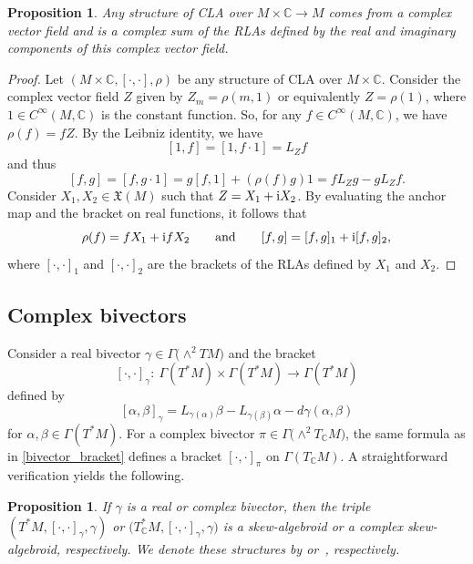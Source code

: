 \documentclass[pdftex]{sigma}
\numberwithin{equation}{section}
\newtheorem{Proposition}[Theorem]{Proposition}
 { \theoremstyle{definition}
\newtheorem{Definition}[Theorem]{Definition}
\newtheorem{Note}[Theorem]{Note}
\newtheorem{Example}[Theorem]{Example}
\newtheorem{Examples}[Theorem]{Examples}
\newtheorem{Remark}[Theorem]{Remark} }
\newcommand{\C}{{\mathbb{C}}}
\begin{document}
\begin{Proposition}
 Any structure of CLA over $M\times \C\to M$ comes from a complex vector field and is a complex sum of the RLAs defined by the real and imaginary components of this complex vector field.
\end{Proposition}
\begin{proof}
 Let $(M\times\C, [\cdot,\cdot], \rho)$ be any structure of CLA over $M\times \C$. Consider the complex vector field $Z$ given by $Z_m=\rho(m,1)$ or equivalently $Z=\rho(1)$, where $1\in C^{\infty}(M,\C)$ is the constant function. So, for any $f\in C^{\infty}(M,\C)$, we have $\rho(f)=fZ$. By the Leibniz identity, we have
 \[[1,f]=[1,f\cdot 1]=L_Z f\]
 and thus
 \[[f,g]=[f,g\cdot 1]=g[f,1]+(\rho(f)g)1=fL_Z g-gL_Z f.\]
 Consider $X_1,X_2\in \mathfrak{X}(M)$ such that $Z=X_1+{\rm i}X_2$. By evaluating the anchor map and the bracket on real functions, it follows that
 \[\rho(f)=fX_1+{\rm i}fX_2\qquad \text{and}\qquad [f,g]=[f,g]_1+{\rm i}[f,g]_2,\]
 where $[\cdot,\cdot]_1$ and $[\cdot,\cdot]_2$ are the brackets of the RLAs defined by $X_1$ and $X_2$.
\end{proof}

\subsection{Complex bivectors}%
Consider a real bivector $\gamma\in \Gamma\bigl(\wedge^2 TM\bigr)$ and the bracket
\[[\cdot,\cdot]_{\gamma}\colon\ \Gamma(T^*M)\times\Gamma(T^*M)\to \Gamma(T^*M)\]
defined by
\begin{equation}\label{bivector_bracket}
[\alpha,\beta]_{\gamma}=L_{\gamma(\alpha)}\beta-L_{\gamma(\beta)}\alpha-d\gamma(\alpha,\beta)
\end{equation}
   for $\alpha, \beta\in \Gamma(T^*M)$. For a complex bivector $\pi\in \Gamma\bigl(\wedge^2 T_{\C}M\bigr)$, the same formula as in \eqref{bivector_bracket} defines a bracket $[\cdot,\cdot]_{\pi}$ on $\Gamma(T_{\C}M)$. A straightforward verification yields the following.
\begin{Proposition}
  If $\gamma$ is a real or complex bivector, then the triple $(T^*M,[\cdot,\cdot]_{\gamma}, \gamma)$ or $\bigl(T_{\C}^*M,\allowbreak [\cdot,\cdot]_{\gamma}, \gamma\bigr)$ is a skew-algebroid or a complex skew-algebroid, respectively. We denote these structures by  or~\smash{$\bigl(T_{\C}^*M\bigr)_{\gamma}$}, respectively.
\end{Proposition}
\end{document}
